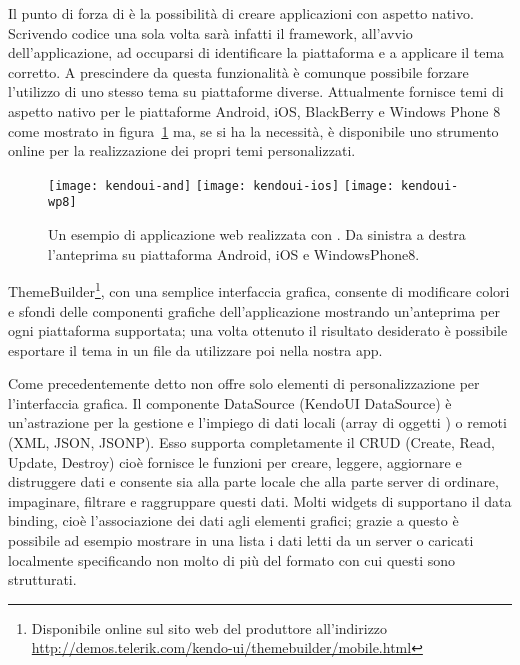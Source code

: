 			Il punto di forza di \kendomob{} è la possibilità di creare
			applicazioni con aspetto nativo. Scrivendo codice una sola volta
			sarà infatti il framework, all'avvio dell'applicazione, ad occuparsi
			di identificare la piattaforma e a applicare il tema corretto. A
			prescindere da questa funzionalità è comunque possibile forzare
			l'utilizzo di uno stesso tema su piattaforme diverse. Attualmente
			\kendomob{} fornisce temi di aspetto nativo per le piattaforme
			Android, iOS, BlackBerry e Windows Phone 8 come mostrato in
			figura~\ref{fig:kendoui} ma, se si ha la necessità, è disponibile
			uno strumento online per la realizzazione dei propri temi
			personalizzati.
			\begin{figure}[h]
				\centering
				\texttt{[image: kendoui-and]}
				\texttt{[image: kendoui-ios]}
				\texttt{[image: kendoui-wp8]}
				\caption{
					Un esempio di applicazione web realizzata con \kendomob{}.
					Da sinistra a destra l'anteprima su piattaforma Android, iOS
					e WindowsPhone8.
				}
				\label{fig:kendoui}
			\end{figure}
			ThemeBuilder\footnote{Disponibile online sul sito web del produttore
			all'indirizzo \url{http://demos.telerik.com/kendo-ui/themebuilder/mobile.html}},
			con una semplice interfaccia grafica, consente di modificare colori e
			sfondi delle componenti grafiche dell'applicazione mostrando
			un'anteprima per ogni piattaforma supportata; una volta ottenuto il
			risultato desiderato è possibile esportare il tema in un file \css{} da
			utilizzare poi nella nostra app.
			
			Come precedentemente detto \kendomob{} non offre solo elementi
			di personalizzazione per l'interfaccia grafica. Il componente
			\mbox{DataSource} (KendoUI \mbox{DataSource}) è un'astrazione per la gestione e
			l'impiego di dati locali (array di oggetti \js{}) o remoti
			(XML, JSON, JSONP).	Esso supporta completamente il CRUD (Create,
			Read, Update, Destroy) cioè fornisce le funzioni per creare,
			leggere, aggiornare e distruggere dati e consente sia alla parte
			locale che alla parte server di ordinare, impaginare, filtrare e
			raggruppare questi dati. Molti widgets di \kendomob{} supportano
			il data binding, cioè l'associazione dei dati agli elementi grafici;
			grazie a questo	è possibile ad esempio mostrare in una lista i dati
			letti da un	server o caricati localmente specificando non molto di
			più del formato con	cui questi sono strutturati.


